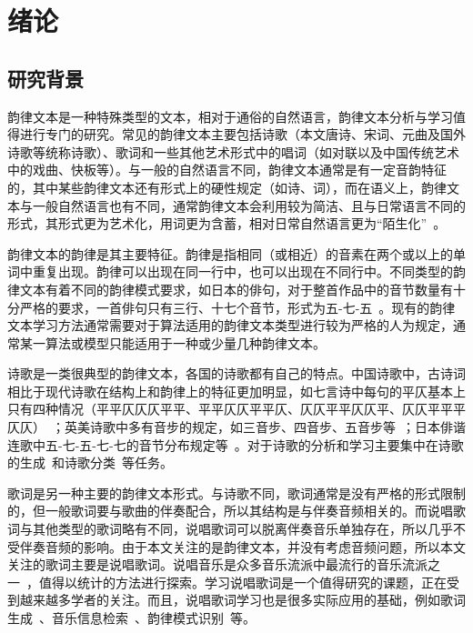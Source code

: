 \chapter{绪论} \label{chpt:A}

\section{研究背景}
韵律文本是一种特殊类型的文本，相对于通俗的自然语言，韵律文本分析与学习值得进行专门的研究。常见的韵律文本主要包括诗歌（本文唐诗、宋词、元曲及国外诗歌等统称诗歌）、歌词和一些其他艺术形式中的唱词（如对联以及中国传统艺术中的戏曲、快板等）。与一般的自然语言不同，韵律文本通常是有一定音韵特征的，其中某些韵律文本还有形式上的硬性规定（如诗、词），而在语义上，韵律文本与一般自然语言也有不同，通常韵律文本会利用较为简洁、且与日常语言不同的形式，其形式更为艺术化，用词更为含蓄，相对日常自然语言更为“陌生化”~\cite{xiao2008mosheng}。\par

韵律文本的韵律是其主要特征。韵律是指相同（或相近）的音素在两个或以上的单词中重复出现。韵律可以出现在同一行中，也可以出现在不同行中。不同类型的韵律文本有着不同的韵律模式要求，如日本的俳句，对于整首作品中的音节数量有十分严格的要求，一首俳句只有三行、十七个音节，形式为五-七-五~\cite{wang2016paiju}。现有的韵律文本学习方法通常需要对于算法适用的韵律文本类型进行较为严格的人为规定，通常某一算法或模型只能适用于一种或少量几种韵律文本。\par

诗歌是一类很典型的韵律文本，各国的诗歌都有自己的特点。中国诗歌中，古诗词相比于现代诗歌在结构上和韵律上的特征更加明显，如七言诗中每句的平仄基本上只有四种情况（平平仄仄仄平平、平平仄仄平平仄、仄仄平平仄仄平、仄仄平平平仄仄）~\cite{song2009pingze}；英美诗歌中多有音步的规定，如三音步、四音步、五音步等~\cite{zhao2007yingmei}；日本俳谐连歌中五-七-五-七-七的音节分布规定等~\cite{wang2016paiju}。对于诗歌的分析和学习主要集中在诗歌的生成~\cite{oliveira2012poetryme,kurzweil2001ray, jiang2015jiyu,he2012generating,mikolov2010recurrent,zhang2014chinese}和诗歌分类~\cite{jamal2012poetry,lou2015multilabel}等任务。\par

歌词是另一种主要的韵律文本形式。与诗歌不同，歌词通常是没有严格的形式限制的，但一般歌词要与歌曲的伴奏配合，所以其结构是与伴奏音频相关的。而说唱歌词与其他类型的歌词略有不同，说唱歌词可以脱离伴奏音乐单独存在，所以几乎不受伴奏音频的影响。由于本文关注的是韵律文本，并没有考虑音频问题，所以本文关注的歌词主要是说唱歌词。说唱音乐是众多音乐流派中最流行的音乐流派之一~\cite{mauch2015evolution}，值得以统计的方法进行探索。学习说唱歌词是一个值得研究的课题，正在受到越来越多学者的关注。而且，说唱歌词学习也是很多实际应用的基础，例如歌词生成~\cite{Potash2015GhostWriter,Malmi2016dopelearning}、音乐信息检索~\cite{Malmi2016dopelearning}、韵律模式识别~\cite{hirjee2009automatic,addanki2013unsupervised}等。\par

